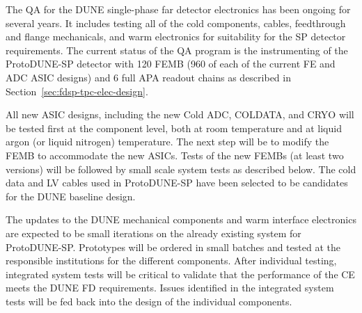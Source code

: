 The QA for the DUNE single-phase far detector electronics has been ongoing for several years. It includes testing all of the cold components, cables, feedthrough and flange mechanicals, and warm electronics for suitability for the SP detector requirements. The current status of the QA program is the instrumenting of the ProtoDUNE-SP detector with 120 FEMB (960 of each of the current FE and ADC ASIC designs) and 6 full APA readout chains as described in Section~\ref{sec:fdsp-tpc-elec-design}.

All new ASIC designs, including the new Cold ADC, COLDATA, and CRYO will be tested first at the component level, both at room temperature and at liquid argon (or liquid nitrogen) temperature. The next step will be to modify the FEMB to accommodate the new ASICs.  Tests of the new FEMBs (at least two versions) will be followed by small scale system tests as described below.  The cold data and LV cables used in ProtoDUNE-SP have been selected to be candidates for the DUNE baseline design.%

The updates to the DUNE mechanical components and warm interface electronics are expected to be small iterations on the already existing system for ProtoDUNE-SP. Prototypes will be ordered in small batches and tested at the responsible institutions for the different components. After individual testing, integrated system tests will be critical to validate that the performance of the CE meets the DUNE FD requirements. Issues identified in the integrated system tests will be fed back into the design of the individual components.
